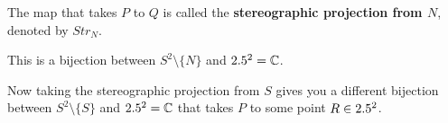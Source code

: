 






















\begin{definition}

The map that takes $P$ to $Q$ is called the \textbf{stereographic projection from $N$}, denoted by $Str_N$.
\end{definition}


\begin{remark}
This is a bijection between $S^2 \setminus \{ N \}$ and $2.5^2 = \mathbb{C}$.
\end{remark}

Now taking the stereographic projection from $S$ gives you a different bijection between $S^2 \setminus \{ S \}$ and $2.5^2 = \mathbb{C}$ that takes $P$ to some point $R \in 2.5^2$.


